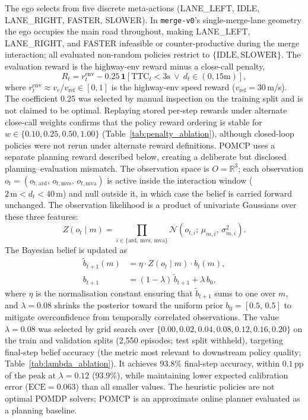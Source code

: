 The ego selects from five discrete meta-actions (LANE\_LEFT, IDLE,
LANE\_RIGHT, FASTER, SLOWER).
In \texttt{merge-v0}'s single-merge-lane geometry the ego occupies the
main road throughout, making LANE\_LEFT, LANE\_RIGHT, and FASTER
infeasible or counter-productive during the merge interaction; all evaluated
non-random policies restrict to $\{\text{IDLE},\text{SLOWER}\}$.
The evaluation reward is the highway-env reward minus a close-call penalty,
\[
  R_t = r^{\mathrm{env}}_t - 0.25\,
  \mathbf{1}[\mathrm{TTC}_t<3\mathrm{s}\ \lor\ d_t\in(0,15\mathrm{m})],
\]
where $r^{\mathrm{env}}_t \approx v_e/v_{\mathrm{ref}} \in [0,1]$ is the
highway-env speed reward ($v_{\mathrm{ref}}{=}30$\,m/s).
The coefficient 0.25 was selected by manual inspection on the training split
and is not claimed to be optimal.
Replaying stored per-step rewards under alternate close-call weights confirms
that the policy reward ordering is stable for $w\in\{0.10,0.25,0.50,1.00\}$
(Table~\ref{tab:penalty_ablation}), although closed-loop policies were not
rerun under alternate reward definitions.
POMCP uses a separate planning reward described below, creating a deliberate
but disclosed planning--evaluation mismatch.
The observation space is $O{=}\mathbb{R}^3$; each observation
$o_t{=}(o_{t,\text{ard}},\,o_{t,\text{mvs}},\,o_{t,\text{mva}})$ is active
inside the interaction window ($2\,\text{m}{<}d_t{<}40\,\text{m}$) and null
outside it, in which case the belief is carried forward unchanged.
The observation likelihood is a product of univariate Gaussians over these
three features:
\[
  Z(o_t \mid m)
  = \prod_{i \in \{\text{ard},\,\text{mvs},\,\text{mva}\}}
    \mathcal{N}(o_{t,i};\,\mu_{m,i},\,\sigma_{m,i}^2).
\]
The Bayesian belief is updated as
\begin{align}
  \tilde{b}_{t+1}(m) &= \eta \cdot Z(o_t \mid m) \cdot b_t(m), \label{eq:bayes}\\
  b_{t+1} &= (1-\lambda)\,\tilde{b}_{t+1} + \lambda\,b_0, \label{eq:reg}
\end{align}
where $\eta$ is the normalisation constant ensuring that $\tilde{b}_{t+1}$ sums
to one over $m$,
and $\lambda{=}0.08$ shrinks the posterior toward the uniform prior
$b_0{=}[0.5,\,0.5]$ to mitigate overconfidence from temporally correlated
observations.
The value $\lambda{=}0.08$ was selected by grid search over
$\{0.00,0.02,0.04,0.08,0.12,0.16,0.20\}$ on the train and validation splits
(2{,}550 episodes; test split withheld), targeting final-step belief accuracy
(the metric most relevant to downstream policy quality;
Table~\ref{tab:lambda_ablation}).
It achieves 93.8\% final-step accuracy, within $0.1$\,pp of the peak at
$\lambda{=}0.12$ (93.9\%), while maintaining lower expected calibration
error ($\text{ECE}{=}0.063$) than all smaller values.
The heuristic policies are not optimal POMDP solvers; POMCP is an approximate
online planner evaluated as a planning baseline.

